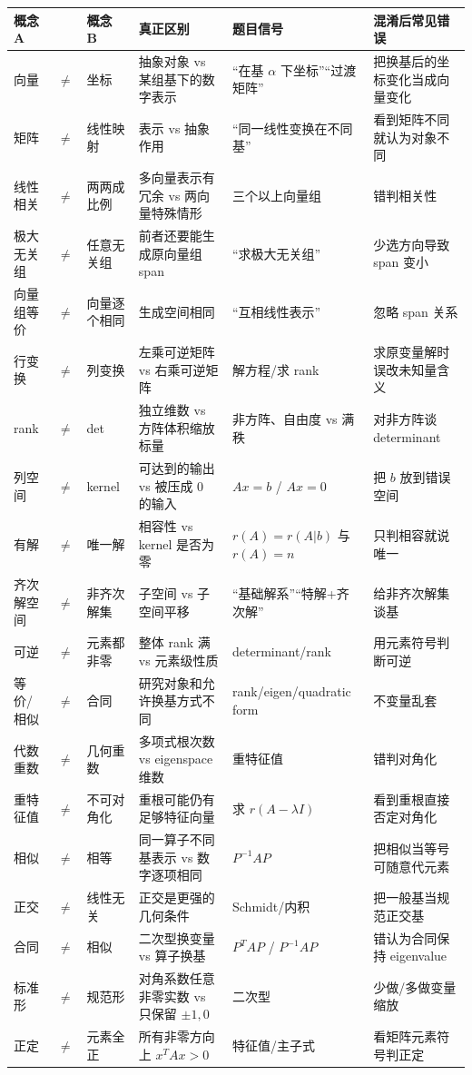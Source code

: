 \documentclass[11pt,a4paper,openany]{ctexbook}
\begin{document}
\begin{longtable}{L{2.2cm}@{}>{\centering\arraybackslash}p{0.5cm}@{}L{2.2cm}L{4.2cm}L{4.2cm}L{\dimexpr\linewidth-13.9cm\relax}}
\toprule
\textbf{概念 A} & & \textbf{概念 B} & \textbf{真正区别} & \textbf{题目信号} & \textbf{混淆后常见错误}\\
\midrule
向量 & $\neq$ & 坐标 & 抽象对象 vs 某组基下的数字表示 & “在基 $\alpha$ 下坐标”“过渡矩阵” & 把换基后的坐标变化当成向量变化\\
矩阵 & $\neq$ & 线性映射 & 表示 vs 抽象作用 & “同一线性变换在不同基” & 看到矩阵不同就认为对象不同\\
线性相关 & $\neq$ & 两两成比例 & 多向量表示有冗余 vs 两向量特殊情形 & 三个以上向量组 & 错判相关性\\
极大无关组 & $\neq$ & 任意无关组 & 前者还要能生成原向量组 span & “求极大无关组” & 少选方向导致 span 变小\\
向量组等价 & $\neq$ & 向量逐个相同 & 生成空间相同 & “互相线性表示” & 忽略 span 关系\\
行变换 & $\neq$ & 列变换 & 左乘可逆矩阵 vs 右乘可逆矩阵 & 解方程/求 rank & 求原变量解时误改未知量含义\\
rank & $\neq$ & det & 独立维数 vs 方阵体积缩放标量 & 非方阵、自由度 vs 满秩 & 对非方阵谈 determinant\\
列空间 & $\neq$ & kernel & 可达到的输出 vs 被压成 0 的输入 & $Ax=b$ / $Ax=0$ & 把 $b$ 放到错误空间\\
有解 & $\neq$ & 唯一解 & 相容性 vs kernel 是否为零 & $r(A)=r(A|b)$ 与 $r(A)=n$ & 只判相容就说唯一\\
齐次解空间 & $\neq$ & 非齐次解集 & 子空间 vs 子空间平移 & “基础解系”“特解+齐次解” & 给非齐次解集谈基\\
可逆 & $\neq$ & 元素都非零 & 整体 rank 满 vs 元素级性质 & determinant/rank & 用元素符号判断可逆\\
等价/相似 & $\neq$ & 合同 & 研究对象和允许换基方式不同 & rank/eigen/quadratic form & 不变量乱套\\
代数重数 & $\neq$ & 几何重数 & 多项式根次数 vs eigenspace 维数 & 重特征值 & 错判对角化\\
重特征值 & $\neq$ & 不可对角化 & 重根可能仍有足够特征向量 & 求 $r(A-\lambda I)$ & 看到重根直接否定对角化\\
相似 & $\neq$ & 相等 & 同一算子不同基表示 vs 数字逐项相同 & $P^{-1}AP$ & 把相似当等号可随意代元素\\
正交 & $\neq$ & 线性无关 & 正交是更强的几何条件 & Schmidt/内积 & 把一般基当规范正交基\\
合同 & $\neq$ & 相似 & 二次型换变量 vs 算子换基 & $P^TAP$ / $P^{-1}AP$ & 错认为合同保持 eigenvalue\\
标准形 & $\neq$ & 规范形 & 对角系数任意非零实数 vs 只保留 $\pm1,0$ & 二次型 & 少做/多做变量缩放\\
正定 & $\neq$ & 元素全正 & 所有非零方向上 $x^TAx>0$ & 特征值/主子式 & 看矩阵元素符号判正定\\
\bottomrule
\end{longtable}
\end{document}
